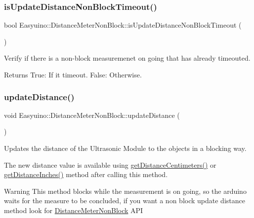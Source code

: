 \subsubsection{\texorpdfstring{is\+Update\+Distance\+Non\+Block\+Timeout()}{isUpdateDistanceNonBlockTimeout()}}
{\footnotesize\ttfamily bool Easyuino\+::\+Distance\+Meter\+Non\+Block\+::is\+Update\+Distance\+Non\+Block\+Timeout (\begin{DoxyParamCaption}{ }\end{DoxyParamCaption})\hspace{0.3cm}{\ttfamily [protected]}}



Verify if there is a non-\/block measuremenet on going that has already timeouted. 

\begin{DoxyReturn}{Returns}
True\+: If it timeout. False\+: Otherwise. 
\end{DoxyReturn}
\mbox{\label{class_easyuino_1_1_distance_meter_non_block_a4ea37c6c0562a76cd03636db329743f9}} 
\subsubsection{\texorpdfstring{update\+Distance()}{updateDistance()}}
{\footnotesize\ttfamily void Easyuino\+::\+Distance\+Meter\+Non\+Block\+::update\+Distance (\begin{DoxyParamCaption}{ }\end{DoxyParamCaption})\hspace{0.3cm}{\ttfamily [virtual]}}



Updates the distance of the Ultrasonic Module to the objects in a blocking way. 

The new distance value is available using \hyperlink{class_easyuino_1_1_distance_meter_non_block_a00419fc2c2ff7c587735063971aa7464}{get\+Distance\+Centimeters()} or \hyperlink{class_easyuino_1_1_distance_meter_a4e3c650c54382d9af6bca51dcac4e7a3}{get\+Distance\+Inches()} method after calling this method. \begin{DoxyWarning}{Warning}
This method blocks while the measurement is on going, so the arduino waits for the measure to be concluded, if you want a non block update distance method look for \hyperlink{class_easyuino_1_1_distance_meter_non_block}{Distance\+Meter\+Non\+Block} A\+PI 
\end{DoxyWarning}


